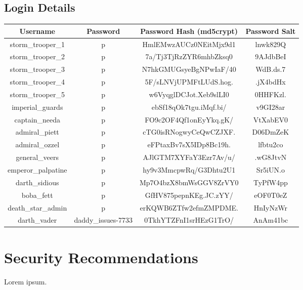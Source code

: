 \documentclass{article}
\begin{document}
\subsection{Login Details}

\begin{adjustwidth}{0cm}{}
\begin{tabular}{ |c|c|c|c| }
\hline
\textbf{Username} & \textbf{Password} & \textbf{Password Hash (md5crypt)} & \textbf{Password Salt} \\
\hline
storm\_trooper\_1 & p & HmlEMwzAUCz0NEitMjx9d1 & lnwk829Q \\
\hline
storm\_trooper\_2 & p & 7a/Tj3TjRzZYR6mhbZksq0 & 9AJdbBeI \\
\hline
storm\_trooper\_3 & p & N7hkGMUGsyeBgNPwIaF/40 & WdB.ds.7 \\
\hline
storm\_trooper\_4 & p & 5F/sLNVjUPMFtLUdS.hog. & .jX4bdHx \\
\hline
storm\_trooper\_5 & p & w6VyqglDCJot.Xeb9slLI0 & 0HHFKzl. \\
\hline
imperial\_guards & p & ebSf18qOk7tgu.iMqf.bi/ & v9GI28ar \\
\hline
captain\_needa & p & FO9c2OF4Qf1onEyYkq.gK/ & VtXabEV0 \\
\hline
admiral\_piett & p & cTG0isRNogwyCeQwCZJXF. & D06DmZeK \\
\hline
admiral\_ozzel & p & eFPtaxBv7sX5IDp8Bc19h. & lfbtu2co \\
\hline
general\_veers & p & AJlGTM7XYFaY3Ezr7Av/u/ & .wG8JtvN \\
\hline
emperor\_palpatine & p & hy9v3MmcpwRq/G3Dhtu2U1 & Sr5iUN.o \\
\hline
darth\_sidious & p & Mp7O4bzX8bmWsGGV8ZrVY0 & TyPfW4pp \\
\hline
boba\_fett & p & GfHV875pepnKEg.JC.zYY/ & eOF0T0eZ \\
\hline
death\_star\_admin & p & erKQWB6ZTfw2efmZMPDME. & HnIyNzWr \\
\hline
darth\_vader & daddy\_issues-7733 & 0TkhYTZFnI1srHEzG1TrO/ & AnAm41bc \\
\hline
\end{tabular}
\end{adjustwidth}

\newpage

\section{Security Recommendations}
\paragraph{}
Lorem ipsum.
\end{document}
